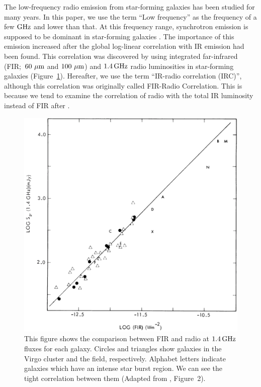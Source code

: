 The low-frequency radio emission from star-forming galaxies has been studied for many years.
In this paper, we use the term ``Low frequency'' as the frequency of a few $\mathrm{GHz}$ and lower than that.
At this frequency range, synchrotron emission is supposed to be dominant in star-forming galaxies \citep{Condon1992a}.
The importance of this emission increased after the global log-linear correlation with IR emission had been found.
This correlation was discovered by \citet{Helou1985} using integrated far-infrared (FIR;~$60\,\,\mathrm{\mu m}$ and $100\,\,\mathrm{\mu m}$) and $1.4\,\mathrm{GHz}$ radio luminosities in star-forming galaxies (Figure~\ref{fig:Helou1985_figure2}).
Hereafter, we use the term ``IR-radio correlation (IRC)'', although this correlation was originally called FIR-Radio Correlation.
This is because we tend to examine the correlation of radio with the total IR luminosity instead of FIR after \citet{Bell2003}.

\begin{figure}[htbp]
	\centering
	\includegraphics[width=.6\linewidth]{Chapter_1/Figures/Helou1985_Figure2.png}
    \caption[FIR and radio correlation]{\label{fig:Helou1985_figure2}
        This figure shows the comparison between FIR and radio at $1.4\,\mathrm{GHz}$ fluxes for each galaxy.
        Circles and triangles show galaxies in the Virgo cluster and the field, respectively.
        Alphabet letters indicate galaxies which have an intense star burst region.
        We can see the tight correlation between them
        (Adapted from \citealt{Helou1985}, Figure~2).
    }
\end{figure}

